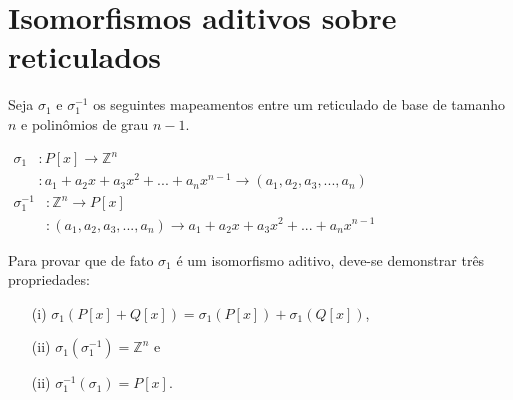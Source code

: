     \pagebreak
    \section{Isomorfismos aditivos sobre reticulados}
        Seja $\sigma_1$ e $\sigma_{1}^{-1}$ os seguintes mapeamentos entre um reticulado de base de tamanho $n$ e polinômios de grau $n-1$.
    
        \begin{center}
            $\begin{array}{rl}
                \sigma_1 &:P[x] \to \mathbb{Z}^n\\
                       &:a_1 + a_2 x + a_3 x^2 + ... + a_{n} x^{n-1} \to (a_1, a_2, a_3, ... , a_{n})
            \end{array}$\\
        
            $\begin{array}{rl}
                \sigma_1^{-1} &:\mathbb{Z}^n \to P[x]\\
                       &:(a_1, a_2, a_3, ... , a_{n}) \to a_1 + a_2 x + a_3 x^2 + ... + a_{n} x^{n-1}
            \end{array}$\\
        \end{center}
    
        Para provar que de fato $\sigma_1$ é um isomorfismo aditivo, deve-se demonstrar três propriedades:
    
        \begin{itemize}
            \item[(i)] $\sigma_1(P[x] + Q[x]) = \sigma_1(P[x]) + \sigma_1(Q[x])$,
            \item[(ii)] $\sigma_1(\sigma_1^{-1}) = \mathbb{Z}^n$ e
            \item[(ii)] $\sigma_1^{-1}(\sigma_1) = P[x]$.
        \end{itemize}
    
